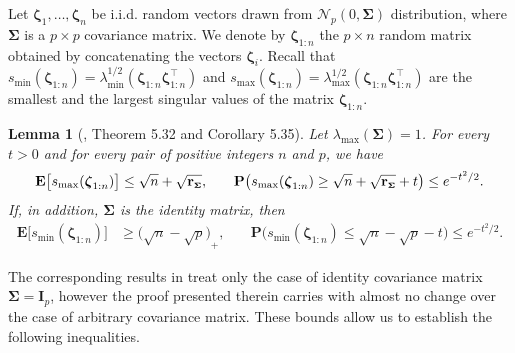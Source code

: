 \documentclass[aos,preprint,reqno]{imsart}
\newcommand\bzeta{\boldsymbol\zeta}
\newcommand\bSigma{\boldsymbol\Sigma}
\newcommand\bfE{\mathbf E}
\newcommand\bfP{\mathbf P}
\newcommand\rSigma{\textbf{\textup{r}}_{\scriptscriptstyle\bSigma}}
\theoremstyle{plain}
\newtheorem{lemma}{Lemma}
\theoremstyle{remark}
\begin{document}
	Let $\bzeta_1,\ldots,\bzeta_n$ be i.i.d. random vectors drawn from 
	$\mathcal N_p(0,\bSigma)$ distribution, where $\bSigma$ is a 
	$p\times p$ covariance matrix. We denote by $\bzeta_{1:n}$ the 
	$p\times n$ random matrix obtained by concatenating the vectors 
	$\bzeta_i$. Recall that $s_{\min}(\bzeta_{1:n}) = 
	\lambda_{\min}^{1/2}(\bzeta_{1:n}\bzeta_{1:n}^\top)$ 
	and $s_{\max}(\bzeta_{1:n}) = \lambda_{\max}^{1/2}
	(\bzeta_{1:n}\bzeta_{1:n}^\top)$ are the smallest and the 
	largest singular values of the matrix $\bzeta_{1:n}$. 

	\begin{lemma}[\cite{vershynin_2012}, Theorem 5.32 and 
	Corollary 5.35]\label{lem:vershynin}
	Let $\lambda_{\max}(\bSigma)=1$. For every $t>0$ and for every 
	pair of positive integers $n$ and $p$, 
	we have
	\begin{align}
		\bfE\big[s_{\max}(\bzeta_{1:n})\big] & \le \sqrt{n} + \sqrt{\rSigma},\quad
		&\bfP\big(s_{\max}(\bzeta_{1:n})  \ge \sqrt{n} + \sqrt{\rSigma} + 
		t\big)  \le e^{-t^2/2}.
	\end{align}
	If, in addition, $\bSigma$ is the identity matrix, then
	\begin{align}
		\bfE\big[s_{\min}(\bzeta_{1:n})\big] & \ge {\big(\sqrt{n}
		-\sqrt{p}\big)}_+,\quad
		&\bfP\big(s_{\min}(\bzeta_{1:n})  \le \sqrt{n} - \sqrt{p} 
		- t\big)  \le e^{-t^2/2}.
	\end{align}
	\end{lemma}
	The corresponding results in \citep{vershynin_2012} treat only 
	the case of identity covariance matrix $\bSigma=\mathbf I_p$, 
	however the proof presented therein carries with almost no 
	change over the case of arbitrary covariance matrix. These 
	bounds allow us to establish the following inequalities. 
\end{document}
